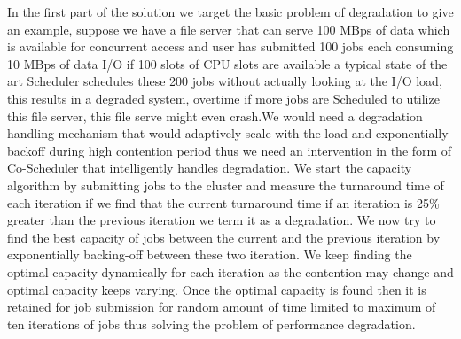 \documentclass[ms,electronic,double]{nuthesis}
\begin{document}
In the first part of the solution we target the basic problem of degradation to give an example, suppose
we have a file server that can serve 100 MBps of data which is available for concurrent access and user has submitted 100 jobs
each consuming 10 MBps of data I/O if 100 slots of CPU slots are available a typical state of the art Scheduler
schedules these 200 jobs without actually looking at the I/O load, this results in a degraded system, 
overtime if more jobs are Scheduled to utilize this file server, this file serve might even crash.We would need a 
degradation handling mechanism that would adaptively scale with the load and  exponentially 
backoff during high contention period thus we need an intervention in the form
of Co-Scheduler that intelligently handles degradation. 
We start the capacity algorithm by submitting jobs to the cluster and measure 
the turnaround time of each iteration if we find that the current turnaround 
time if an iteration is 25\% greater than the previous iteration we term it as a 
degradation. We now try to find the best capacity of jobs between the current 
and the previous iteration by exponentially backing-off between these two iteration. We keep finding the optimal
capacity dynamically for each iteration as the contention may change and optimal capacity keeps 
 varying. Once the optimal capacity is found then it is retained for job submission for random amount of time
 limited to maximum of ten iterations of jobs thus solving the problem of performance degradation. 
 
\end{document}
